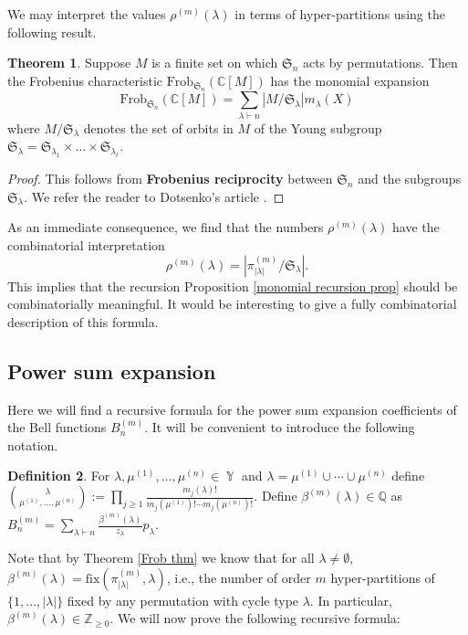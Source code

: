 \documentclass[12pt,reqno]{amsart}
\theoremstyle{definition}
\newtheorem{thm}{Theorem}[section]
\newtheorem{defn}[thm]{Definition}
\DeclareMathOperator{\Par}{\mathbb{Y}}
\begin{document}
We may interpret the values $\rho^{(m)}(\lambda)$ in terms of hyper-partitions using the following result. 

\begin{thm}
    Suppose $M$ is a finite set on which $\mathfrak{S}_n$ acts by permutations. Then the Frobenius characteristic $\mathrm{Frob}_{\mathfrak{S}_n}(\mathbb{C}[M])$ has the monomial expansion 
    $$\mathrm{Frob}_{\mathfrak{S}_n}(\mathbb{C}[M]) = \sum_{\lambda \vdash n} |M/\mathfrak{S}_{\lambda}| m_{\lambda}(X)$$ where $M/\mathfrak{S}_{\lambda}$ denotes the set of orbits in $M$ of the Young subgroup $\mathfrak{S}_{\lambda} = \mathfrak{S}_{\lambda_1}\times \ldots \times \mathfrak{S}_{\lambda_{\ell}}.$
\end{thm}
\begin{proof}
    This follows from \textbf{Frobenius reciprocity} between $\mathfrak{S}_n$ and the subgroups $\mathfrak{S}_{\lambda}.$ We refer the reader to Dotsenko's article \cite{Dotsenko}.
\end{proof}

As an immediate consequence, we find that the numbers $\rho^{(m)}(\lambda)$ have the combinatorial interpretation 
$$\rho^{(m)}(\lambda) = | \pi_{|\lambda|}^{(m)}/\mathfrak{S}_{\lambda}|.$$ This implies that the recursion Proposition \ref{monomial recursion prop} should be combinatorially meaningful. It would be interesting to give a fully combinatorial description of this formula.


\subsection{Power sum expansion}

Here we will find a recursive formula for the power sum expansion coefficients of the Bell functions $B_n^{(m)}.$ It will be convenient to introduce the following notation.

\begin{defn}
    For $\lambda, \mu^{(1)},\ldots,\mu^{(n)} \in \Par$ and $\lambda = \mu^{(1)}\cup\cdots\cup \mu^{(n)} $ define 
    $ \binom{\lambda}{\mu^{(1)},\ldots,\mu^{(n)}}:= \prod_{j \geq 1} \frac{m_j(\lambda)!}{m_j(\mu^{(1)})!\cdots m_j(\mu^{(n)})!}.$ Define $\beta^{(m)}(\lambda) \in \mathbb{Q}$ as 
    $B_n^{(m)} = \sum_{\lambda \vdash n} \frac{\beta^{(m)}(\lambda)}{z_{\lambda}} p_{\lambda}.$
\end{defn}

Note that by Theorem \ref{Frob thm} we know that for all $\lambda \neq \emptyset,$
$\beta^{(m)}(\lambda) = \mathrm{fix}(\pi_{|\lambda|}^{(m)},\lambda)$, i.e., the number of order $m$ hyper-partitions of $\{1,\ldots,|\lambda|\}$ fixed by any permutation with cycle type $\lambda.$ In particular, $\beta^{(m)}(\lambda) \in \mathbb{Z}_{\geq 0}.$ We will now prove the following recursive formula:
\end{document}
